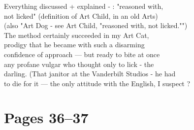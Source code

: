 \documentclass[11pt,a4paper]{article}
\begin{document}
{Everything discussed + explained - : "reasoned with, \\
not licked" (definition of Art Child, in an old Arts) \\
(also "Art Dog - see Art Child, "reasoned with, not licked."") \\
The method certainly succeeded in my Art Cat, \\
prodigy that he became with such a disarming \\
confidence of approach --- but ready to bite at once \\
any profane vulgar who thought only to lick - the \\
darling. (That janitor at the Vanderbilt Studios -  he had \\
to die for it --- the only attitude with the English, I suspect ?}








\section{Pages 36--37}
\end{document}
